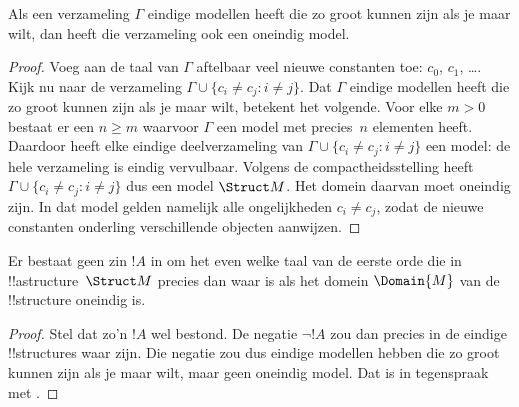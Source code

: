 \documentclass[../../../include/open-logic-section]{subfiles}
\begin{document}

\begin{thm}
 Als een verzameling $\Gamma$ eindige modellen heeft
die zo groot kunnen zijn als je maar wilt, dan heeft die verzameling ook
een oneindig model.
\end{thm}

\begin{proof}
Voeg aan de taal van $\Gamma$ aftelbaar veel nieuwe constanten toe:
$c_0$, $c_1$, \dots. Kijk nu naar de verzameling $\Gamma \cup \{c_i \neq c_j :
i \neq j\}$. Dat $\Gamma$ eindige modellen heeft die zo groot kunnen
zijn als je maar wilt, betekent het volgende. Voor elke $m >0$ bestaat er
een $n\ge m$ waarvoor $\Gamma$ een model met precies~$n$ elementen heeft.
Daardoor heeft elke eindige deelverzameling van $\Gamma \cup \{c_i \neq
c_j : i \neq j\}$ een model: de hele verzameling is eindig vervulbaar.
Volgens de compactheidsstelling heeft $\Gamma \cup \{c_i \neq c_j : i
\neq j\}$ dus een model $\Struct M$. Het domein daarvan moet oneindig
zijn. In dat model gelden namelijk alle ongelijkheden $c_i \neq c_j$,
zodat de nieuwe constanten onderling verschillende objecten aanwijzen.
\end{proof}

\begin{prop}
Er bestaat geen zin $!A$ in om het even welke taal van de eerste orde die
in !!a{structure}~$\Struct M$ precies dan waar is als het domein
$\Domain{M}$ van de !!{structure} oneindig is.
\end{prop}

\begin{proof}
Stel dat zo'n $!A$ wel bestond. De negatie $\lnot !A$ zou dan precies in
de eindige !!{structure}s waar zijn. Die negatie zou dus eindige modellen
hebben die zo groot kunnen zijn als je maar wilt, maar geen oneindig
model. Dat is in tegenspraak met .
\end{proof}
\end{document}
